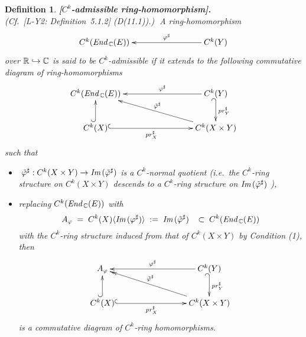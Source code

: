 \documentclass[11pt]{article}
\numberwithin{equation}{subsection}
\newtheorem{sdefinition}[stheorem]{Definition}
\newcommand{\End}{\mbox{\it End}\,}
\newcommand{\Image}{\mbox{\it Im}\,}
\begin{document}
\begin{sdefinition} {\bf [$C^k$-admissible ring-homomorphism].} \rm\\
 (Cf.\ [L-Y2: Definition~5.1.2] (D(11.1)).)$\;$
 A ring-homomorphism
    $$
	  \xymatrix{
	   C^k(\End_{\Bbb C}(E))   &&& C^k(Y)\ar[lll]_-{\varphi^{\sharp}}
	   }
	$$
    over ${\Bbb R}\hookrightarrow {\Bbb C}$
    is said to be {\it $C^k$-admissible}	
    if it extends to the following commutative diagram of ring-homomorphisms
	 $$
		 \xymatrix{
	       C^k(\End_{\Bbb C}(E))
			     &&& C^k(Y) \ar[lll]_-{\varphi^{\sharp}}
			                                      \ar@{_{(}->}^-{pr_Y^{\sharp}}[d]   \\			    
			   \rule{0ex}{1em}C^k(X) \ar@{^{(}->}[u]
			                                                                 \ar@{^{(}->}[rrr]_-{pr_X^{\sharp}}
				 &&& C^k(X\times Y) \ar[lllu]_-{\tilde{\varphi}^{\sharp}}		
		}
	 $$
	 such that
	  \begin{itemize}
	   \item[(1)]
	      $\;\tilde{\varphi}^{\sharp}: C^k(X\times Y)
	                  \rightarrow \Image(\tilde{\varphi}^{\sharp})$
			    is  a $C^k$-normal quotient
		 (i.e.\ the $C^k$-ring structure on $C^k(X\times Y)$ descends
		            to a $C^k$-ring structure on $\Image(\tilde{\varphi}^{\sharp})$ ),
 			
      \item[(2)]
	     replacing $C^k(\End_{\Bbb C}(E))$ with
             $$
			  A_{\varphi}\;
			     =\; C^k(X)\langle \Image(\varphi^{\sharp})\rangle\;
			    :=\; \Image(\tilde{\varphi}^{\sharp})\;\;\;
			   \subset\; C^k(\End_{\Bbb C}(E))
			   $$
			  with the $C^k$-ring structure induced from that of $C^k(X\times Y)$ by Condition (1),
          then 			
  	    $$
		 \xymatrix{
	       A_{\varphi}
			     &&& C^k(Y) \ar[lll]_-{\varphi^{\sharp}}
			                                      \ar@{_{(}->}^-{pr_Y^{\sharp}}[d]   \\			    
			   \rule{0ex}{1em}C^k(X) \ar@{^{(}->}[u]
			                                                                 \ar@{^{(}->}[rrr]_-{pr_X^{\sharp}}
				 &&& C^k(X\times Y) \ar@{->>}[lllu]_-{\tilde{\varphi}^{\sharp}}		
		}
	   $$
	   is a commutative diagram of $C^k$-ring homomorphisms.
   \end{itemize}	
\end{sdefinition}

\bigskip
\end{document}
